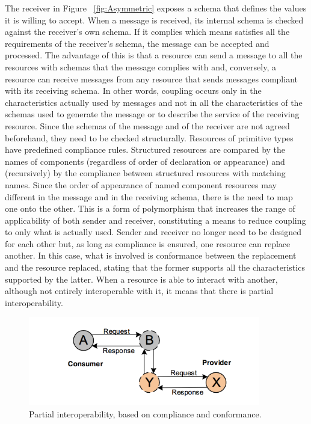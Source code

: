 The receiver in Figure ~\ref{fig:Asymmetric} exposes a schema that defines the values it is willing to accept.
When a message is received, its internal schema is checked against the receiver’s own schema. If it complies which means satisfies all the requirements of the receiver’s schema, the message can be accepted and processed. The advantage of this is that a resource can send a message to all the resources with schemas that the message complies with and, conversely, a resource can receive messages from any resource that sends messages compliant with its receiving schema. In other words, coupling occurs only in the characteristics actually used by messages and not in all the characteristics of the schemas used to generate the message or to describe the service of the receiving resource. Since the schemas of the message and of the receiver are not agreed beforehand, they need to be checked structurally. Resources of primitive types have predefined compliance rules. Structured resources are compared by the names of components (regardless of order of declaration or appearance) and (recursively) by the compliance between structured resources with matching names. Since the order of appearance of named component resources may different in the message and in the receiving schema, there is the need to map one onto the other. This is a form of polymorphism that increases the range of applicability of both sender and receiver, constituting a means to reduce coupling to only what is actually used. Sender and receiver no longer need to be designed for each other but, as long as compliance is ensured, one resource can replace another. In this case, what is involved is conformance between the replacement and the resource replaced, stating that the former supports all the characteristics supported by the latter. When a resource is able to interact with another, although not entirely interoperable with it, it means that there is partial interoperability.

\begin{figure}[!htb]
 \centering
 \includegraphics[width=0.9\textwidth]{Figures/partial.png}
 \caption[Partial interoperability, based on compliance and conformance.]{Partial interoperability, based on compliance and conformance.}
 \label{fig:Partial}
\end{figure}

